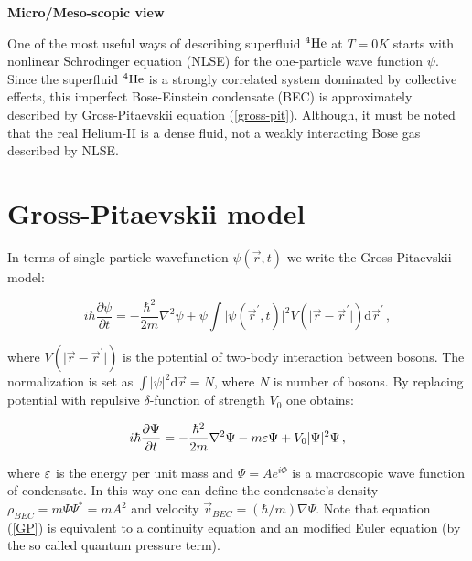 
\newpage

{\Huge \bfseries Micro/Meso-scopic view}
\vspace{0.3cm}

One of the most useful ways of describing superfluid ${}^4\mathrm{He}$ at $T=0\unit{K}$ starts with nonlinear Schrodinger equation (NLSE) for the one-particle wave function $\psi$. Since the superfluid ${}^4\mathrm{He}$ is a strongly correlated system dominated by collective effects, this imperfect Bose-Einstein condensate (BEC) is approximately described by Gross-Pitaevskii equation (\ref{gross-pit}). Although, it must be noted that the real Helium-II is a dense fluid, not a weakly interacting Bose gas described by NLSE.


\section{Gross-Pitaevskii model}

In terms of single-particle wavefunction $\psi(\vec{r},t)$ we write the Gross-Pitaevskii model:

\begin{equation}
i \hbar \frac{\partial \psi}{\partial t} = - \frac{\hbar^2}{2m} \nabla^2 \psi
+ \psi \int \vert \psi(\vec{r}^{\prime},t) \vert^2 V(\vert \vec{r} - \vec{r}^{\prime} \vert)
\text{d}\vec{r}^{\prime}\,,
\label{gross-pit}
\end{equation}

where $V(\vert \vec{r} - \vec{r}^{\prime} \vert)$ is the potential of two-body interaction between bosons. The normalization is set as $\int \vert \psi \vert^2 \text{d}\vec{r} = N$, where $N$ is number of bosons. By replacing potential with repulsive $\delta$-function of strength $V_0$ one obtains:

\begin{equation}
i \hbar \frac{\partial \Psi}{\partial t} = - \frac{\hbar^2}{2m} \nabla^2 \Psi - m\varepsilon \Psi + V_0 \vert \Psi \vert^2 \Psi\,,
\label{GP}
\end{equation}

where $\varepsilon$ is the energy per unit mass and $\Psi = A e^{i\Phi}$ is a macroscopic wave function of condensate. In this way one can define the condensate's density $\rho_{BEC} = m\Psi\Psi^* =  mA^2$ and velocity $\vec{v}_{BEC} = (\hbar / m)\nabla \Psi$. Note that equation (\ref{GP}) is equivalent to a continuity equation and an modified Euler equation (by the so called quantum pressure term).

